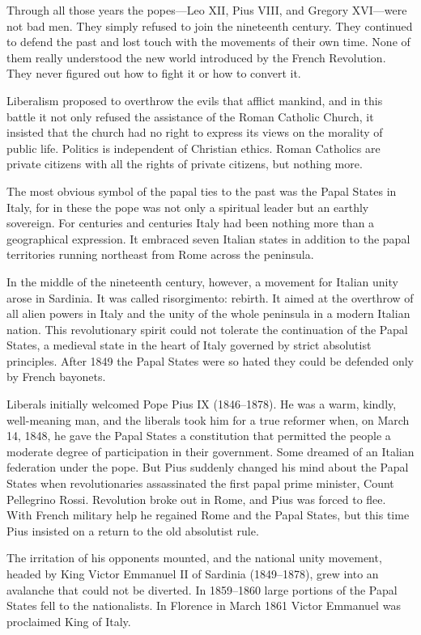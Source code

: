 Through all those years the popes—Leo XII, Pius VIII, and Gregory XVI—were not bad men. They simply
refused to join the nineteenth century. They continued to defend the past and lost touch with the
movements of their own time. None of them really understood the new world introduced by the French
Revolution. They never figured out how to fight it or how to convert it.

Liberalism proposed to overthrow the evils that afflict mankind, and in this battle it not only
refused the assistance of the Roman Catholic Church, it insisted that the church had no right to
express its views on the morality of public life. Politics is independent of Christian ethics. Roman
Catholics are private citizens with all the rights of private citizens, but nothing more.

The most obvious symbol of the papal ties to the past was the Papal States in Italy, for in these
the pope was not only a spiritual leader but an earthly sovereign. For centuries and centuries Italy
had been nothing more than a geographical expression. It embraced seven Italian states in addition
to the papal territories running northeast from Rome across the peninsula.

In the middle of the nineteenth century, however, a movement for Italian unity arose in Sardinia. It
was called risorgimento: rebirth. It aimed at the overthrow of all alien powers in Italy and the
unity of the whole peninsula in a modern Italian nation. This revolutionary spirit could not
tolerate the continuation of the Papal States, a medieval state in the heart of Italy governed by
strict absolutist principles. After 1849 the Papal States were so hated they could be defended only
by French bayonets.

Liberals initially welcomed Pope Pius IX (1846–1878). He was a warm, kindly, well-meaning man, and
the liberals took him for a true reformer when, on March 14, 1848, he gave the Papal States a
constitution that permitted the people a moderate degree of participation in their government. Some
dreamed of an Italian federation under the pope. But Pius suddenly changed his mind about the Papal
States when revolutionaries assassinated the first papal prime minister, Count Pellegrino Rossi.
Revolution broke out in Rome, and Pius was forced to flee. With French military help he regained
Rome and the Papal States, but this time Pius insisted on a return to the old absolutist rule.

The irritation of his opponents mounted, and the national unity movement, headed by King Victor
Emmanuel II of Sardinia (1849–1878), grew into an avalanche that could not be diverted. In 1859–1860
large portions of the Papal States fell to the nationalists. In Florence in March 1861 Victor
Emmanuel was proclaimed King of Italy.

